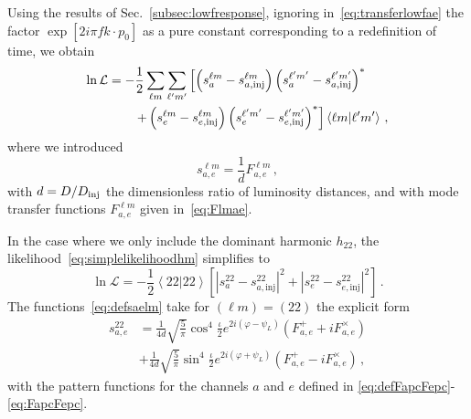 \documentclass[aps,showpacs,twocolumn,prd,superscriptaddress,nofootinbib]{revtex4-1}
\newcommand{\be}{\begin{equation}}
\newcommand{\ee}{\end{equation}}
\newcommand\calL{{\mathcal{L}}}
\newcommand{\nn}{\nonumber}
\newcommand\psiL{{\psi_{L}}}
\begin{document}
Using the results of Sec.~\ref{subsec:lowfresponse}, ignoring in~\eqref{eq:transferlowfae} the factor $\exp [2 i \pi f k\cdot p_{0}]$ as a pure constant corresponding to a redefinition of time, we obtain
\begin{align}\label{eq:simplelikelihoodhm}
	\ln \calL &= -\frac{1}{2} \sum_{\ell m} \sum_{\ell' m'} \left[ \left( \vphantom{s_{a}^{\ell' m'} } s_{a}^{\ell m} - s_{a, \mathrm{inj}}^{\ell m}\right) \left( s_{a}^{\ell' m'} - s_{a, \mathrm{inj}}^{\ell' m'}\right)^{*} \right. \nn\\
	& \qquad \left. + \left( \vphantom{s_{a}^{\ell' m'} } s_{e}^{\ell m} - s_{e, \mathrm{inj}}^{\ell m}\right) \left( s_{e}^{\ell' m'} - s_{e, \mathrm{inj}}^{\ell' m'}\right)^{*} \right] \left\langle \ell m | \ell' m' \right\rangle \,,
\end{align}
where we introduced
\be\label{eq:defsaelm}
	s_{a,e}^{\ell m} = \frac{1}{d} F_{a,e}^{\ell m} \,,
\ee
with $d = D / D_{\rm inj}$ the dimensionless ratio of luminosity distances, and with mode transfer functions $F_{a,e}^{\ell m}$ given in~\eqref{eq:Flmae}.

In the case where we only include the dominant harmonic $h_{22}$, the likelihood~\eqref{eq:simplelikelihoodhm} simplifies to
\be\label{eq:simplelikelihood22}
	\ln \calL = -\frac{1}{2} \left\langle 22 | 22 \right\rangle  \left[ \left| s_{a}^{22} - s_{a, \mathrm{inj}}^{22} \right|^{2} + \left| s_{e}^{22} - s_{e, \mathrm{inj}}^{22}\right|^{2} \right] \,.
\ee
The functions~\eqref{eq:defsaelm} take for $(\ell m)=(22)$ the explicit form
\begin{align}
	s_{a,e}^{22} &= \frac{1}{4d} \sqrt{\frac{5}{\pi}} \cos^{4}\frac{\iota}{2} e^{2i(\varphi-\psiL)} \left( F_{a,e}^{+} + i F_{a,e}^{\times} \right) \\
	&+ \frac{1}{4d} \sqrt{\frac{5}{\pi}} \sin^{4}\frac{\iota}{2} e^{2i(\varphi+\psiL)} \left( F_{a,e}^{+} - i F_{a,e}^{\times} \right) \,,
\end{align}
with the pattern functions for the channels $a$ and $e$ defined in \eqref{eq:defFapcFepc}-\eqref{eq:FapcFepc}.
\end{document}
